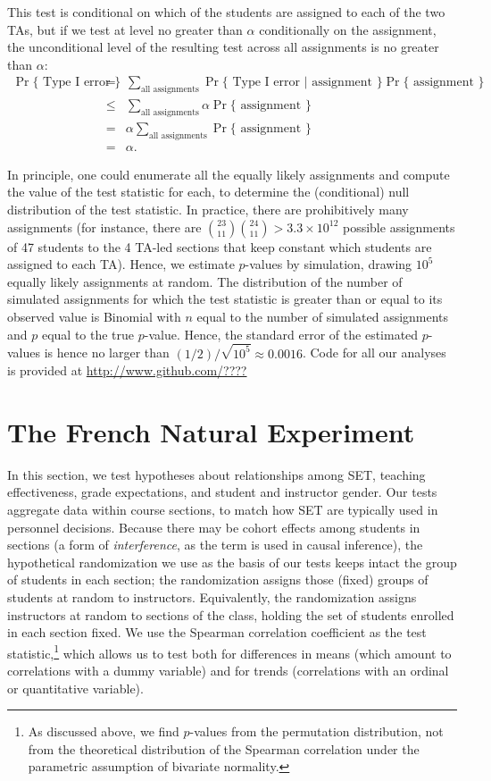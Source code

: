 \documentclass[12pt]{article}
\newcommand{\todo}[1]{{\color{red}{TO DO: \sc #1}}}
\begin{document}
This test is conditional on which of the students are assigned to each of the two 
TAs, but if we test at level no greater than $\alpha$ conditionally on the
assignment, the unconditional level of the resulting test across all assignments is no 
greater than $\alpha$:
\begin{eqnarray}
   \Pr \{ \mbox{ Type I error } \} &=& \sum_{\mbox{all assignments}} \Pr \{ \mbox{ Type I error } | 
   \mbox{ assignment } \} \Pr\{\mbox{ assignment } \} \nonumber \\
   &\le& 
    \sum_{\mbox{all assignments}} \alpha \Pr\{\mbox{ assignment } \} \nonumber \\
    &=& \alpha \sum_{\mbox{all assignments}} \Pr\{\mbox{ assignment } \} \nonumber \\
    &=& \alpha.
\end{eqnarray}

In principle, one could enumerate all the equally likely assignments and compute the value
of the test statistic for each, to determine the (conditional) null distribution of the test
statistic.
In practice, there are prohibitively many assignments
(for instance, there are ${{23}\choose{11}}{{24}\choose{11}} > 3.3\times 10^{12}$ 
possible assignments
of 47 students to the 4 TA-led sections that keep constant which
students are assigned to each TA).
Hence, we estimate $p$-values by simulation, drawing $10^5$ equally likely assignments
at random.
The distribution of the number of simulated assignments for which the test statistic
is greater than or equal to its observed value is Binomial with $n$ equal to the number of
simulated assignments and $p$ equal to the true $p$-value.
Hence, the standard error of the estimated $p$-values is hence no larger than 
$(1/2)/ \sqrt{10^5}
\approx 0.0016$.
Code for all our analyses is provided at \url{http://www.github.com/????} \todo{Fix!}

\section{The French Natural Experiment}
In this section, we test hypotheses about relationships among
SET, teaching effectiveness, grade expectations, and student and instructor gender.
Our tests aggregate data within course sections, to match how SET are typically
used in personnel decisions. 
Because there may be cohort effects among students in sections (a form of
\emph{interference}, as the term is used in causal inference), the hypothetical randomization we
use as the basis of our tests keeps intact the group of students in each section;
the randomization assigns those (fixed) groups of students at random to instructors.
Equivalently, the randomization assigns instructors at random to sections of the class,
holding the set of students enrolled in each section fixed.
We use the Spearman correlation coefficient as the test statistic,\footnote{%
As discussed above, we find $p$-values from the permutation distribution, not from
the theoretical distribution of the Spearman correlation 
under the parametric assumption of bivariate normality.
} 
which allows us to test both for 
differences in means (which amount to correlations with a dummy variable) and for 
trends (correlations with an ordinal or quantitative variable).
\end{document}
